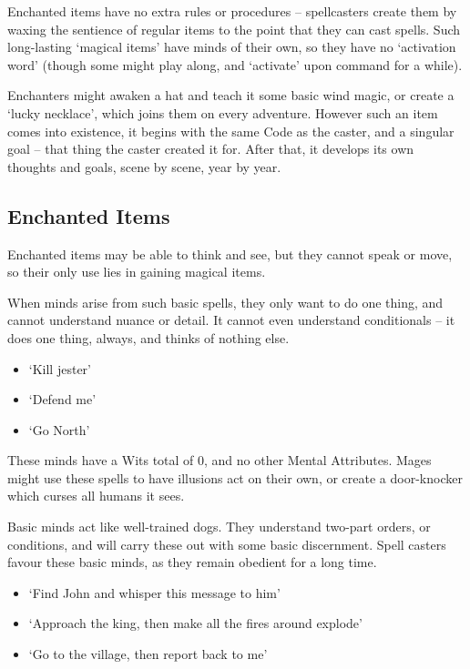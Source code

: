 \begin{multicols}{2}

Enchanted items have no extra rules or procedures -- spellcasters create them by waxing the sentience of regular items to the point that they can cast spells.
Such long-lasting `magical items' have minds of their own, so they have no `activation word' (though some might play along, and `activate' upon command for a while).

Enchanters might awaken a hat and teach it some basic wind magic, or create a `lucky necklace', which joins them on every adventure.
However such an item comes into existence, it begins with the same Code as the caster,%
and a singular goal -- that thing the caster created it for.
After that, it develops its own thoughts and goals, scene by scene, year by year.

\subsection{Enchanted Items}

Enchanted items may be able to think and see, but they cannot speak or move, so their only use lies in gaining magical items.


When minds arise from such basic spells, they only want to do one thing, and cannot understand nuance or detail.
It cannot even understand conditionals -- it does one thing, always, and thinks of nothing else.

\begin{itemize}
  \item
    `Kill jester'
  \item
    `Defend me'
  \item
    `Go North'
\end{itemize}

These minds have a Wits total of 0, and no other Mental Attributes.
Mages might use these spells to have illusions act on their own, or create a door-knocker which curses all humans it sees.


Basic minds act like well-trained dogs.
They understand two-part orders, or conditions, and will carry these out with some basic discernment.
Spell casters favour these basic minds, as they remain obedient for a long time.

\begin{itemize}
  \item
    `Find John and whisper this message to him'
  \item
    `Approach the king, then make all the fires around explode'
  \item
    `Go to the village, then report back to me'
\end{itemize}


\end{multicols}
